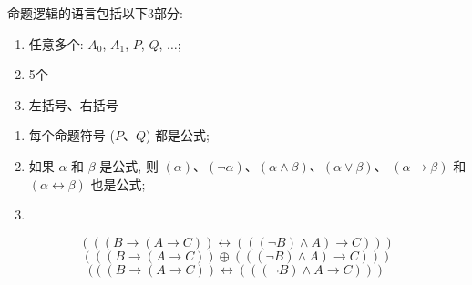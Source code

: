 \begin{frame}[fragile]{}
  \begin{definition}[命题逻辑的语言]
    命题逻辑的语言包括以下3部分:
    \begin{enumerate}[(1)]
      \setlength{\itemsep}{5pt}
      \item 任意多个: $A_{0}$, $A_{1}$, $P$, $Q$, $\dots$;
      \item 5个
        
      \item 左括号、右括号
    \end{enumerate}
  \end{definition}
\end{frame}

\begin{frame}{}
  \begin{definition}
    \begin{enumerate}[(1)]
      \setlength{\itemsep}{8pt}
      \item 每个命题符号 ($P$、$Q$) 都是公式;
      \item 如果 $\alpha$ 和 $\beta$ 是公式,
        则 $(\alpha)$、$(\lnot \alpha)$、$(\alpha \land \beta)$、$(\alpha \lor \beta)$、
        $(\alpha \to \beta)$ 和 $(\alpha \leftrightarrow \beta)$ 也是公式;
      \item {}
    \end{enumerate}
  \end{definition}

  \pause
  \[
    (((B \to (A \to C)) \leftrightarrow (((\lnot B) \land A) \to C)))
  \]
  \pause
  \[
    (((B \to (A \to C)) \oplus (((\lnot B) \land A) \to C)))
  \]
  \pause
  \[
    (((B \to (A \to C)) \leftrightarrow (((\lnot B) \land A \to C)))
  \]
\end{frame}

